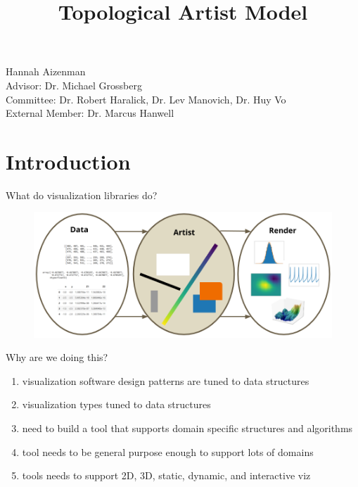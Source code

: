 \documentclass[xcolor={dvipsnames}, handout]{beamer}
\begin{document}
\title{Topological Artist Model}

\begin{frame}
	\titlepage
    Hannah Aizenman\\
    Advisor: Dr. Michael Grossberg \\
    Committee: Dr. Robert Haralick, Dr. Lev Manovich, Dr. Huy Vo\\
    External Member: Dr. Marcus Hanwell
\end{frame}

\section{Introduction}

\begin{frame}{What do visualization libraries do?}
    \begin{figure}
        \includegraphics[width=1\linewidth]{figures/intro/dar.png}
    \end{figure}
\end{frame}

\begin{frame}{Why are we doing this?}
    \begin{enumerate}
        \item visualization software design patterns are tuned to data structures\cite{HeerSoftware2006}
        \item visualization types tuned to data structures\cite{toryRethinkingVisualizationHighlevel2004}
        \item need to build a tool that supports domain specific structures and algorithms
        \item tool needs to be general purpose enough to support lots of domains
        \item tools needs to support 2D, 3D, static, dynamic, and interactive viz
    \end{enumerate}
\end{frame}
\end{document}
